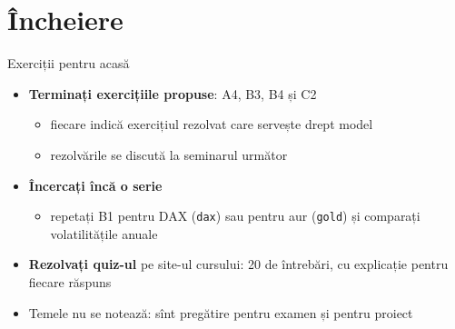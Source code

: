 \section{Încheiere}

\begin{frame}{Exerciții pentru acasă}
\itemsize{\small}
\begin{itemize}
    \item \textbf{Terminați exercițiile propuse}: A4, B3, B4 și C2
    \begin{itemize}
        \item fiecare indică exercițiul rezolvat care servește drept model
        \item rezolvările se discută la seminarul următor
    \end{itemize}
    \item \textbf{Încercați încă o serie}
    \begin{itemize}
        \item repetați B1 pentru DAX (\texttt{dax}) sau pentru aur (\texttt{gold}) și comparați volatilitățile anuale
    \end{itemize}
    \item \textbf{Rezolvați quiz-ul } pe site-ul cursului: 20 de întrebări, cu explicație pentru fiecare răspuns
    \item Temele nu se notează: sînt pregătire pentru examen și pentru proiect
\end{itemize}
\end{frame}

